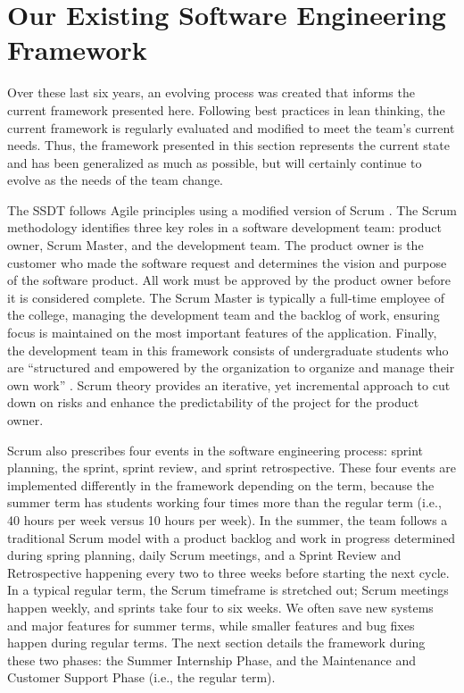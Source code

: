 \section{Our Existing Software Engineering Framework}

Over these last six years, an evolving process was created that informs the current framework presented here. Following best practices in lean thinking, the current framework is regularly evaluated and modified to meet the team's current needs. Thus, the framework presented in this section represents the current state and has been generalized as much as possible, but will certainly continue to evolve as the needs of the team change.

The SSDT follows Agile principles \cite{agilemanifesto} using a modified version of Scrum \cite{thescrumguide}. The Scrum methodology identifies three key roles in a software development team: product owner, Scrum Master, and the development team. The product owner is the customer who made the software request and determines the vision and purpose of the software product. All work must be approved by the product owner before it is considered complete. The Scrum Master is typically a full-time employee of the college, managing the development team and the backlog of work, ensuring focus is maintained on the most important features of the application. Finally, the development team in this framework consists of undergraduate students who are ``structured and empowered by the organization to organize and manage their own work'' \cite{thescrumguide}. Scrum theory provides an iterative, yet incremental approach to cut down on risks and enhance the predictability of the project for the product owner.

Scrum also prescribes four events in the software engineering process: sprint planning, the sprint, sprint review, and sprint retrospective. These four events are implemented differently in the framework depending on the term, because the summer term has students working four times more than the regular term (i.e., 40 hours per week versus 10 hours per week). In the summer, the team follows a traditional Scrum model with a product backlog and work in progress determined during spring planning, daily Scrum meetings, and a Sprint Review and Retrospective happening every two to three weeks before starting the next cycle. In a typical regular term, the Scrum timeframe is stretched out; Scrum meetings happen weekly, and sprints take four to six weeks. We often save new systems and major features for summer terms, while smaller features and bug fixes happen during regular terms. The next section details the framework during these two phases: the Summer Internship Phase, and the Maintenance and Customer Support Phase (i.e., the regular term).

